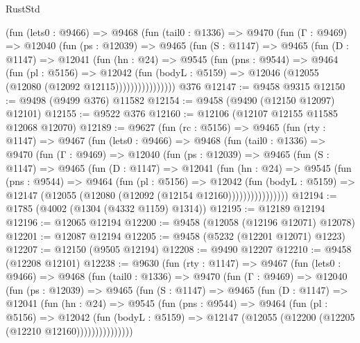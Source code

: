 \begin{lexlean}{RustStd}
\begin{coremodule}
          (fun (lets0 : @9466) =>
          @9468
            (fun (tail0 : @1336) =>
            @9470
              (fun (Γ : @9469) =>
              @12040
                (fun (ps : @12039) =>
                @9465
                  (fun (S : @1147) =>
                  @9465
                    (fun (D : @1147) =>
                    @12041
                      (fun (hn : @24) =>
                      @9545
                        (fun (pns : @9544) =>
                        @9464
                          (fun (pl : @5156) =>
                          @12042
                            (fun (bodyL : @5159) =>
                            @12046 (@12055 (@12080 (@12092 @12115))))))))))))))))
    @376
@12147 := @9458 @9315
@12150 := @9498 (@9499 @376) @11582
@12154 := @9458 (@9490 (@12150 @12097) @12101)
@12155 := @9522 @376
@12160 := @12106 (@12107 @12155 @11585 @12068 @12070)
@12189 := @9627
    (fun (rc : @5156) =>
    @9465
      (fun (rty : @1147) =>
      @9467
        (fun (lets0 : @9466) =>
        @9468
          (fun (tail0 : @1336) =>
          @9470
            (fun (Γ : @9469) =>
            @12040
              (fun (ps : @12039) =>
              @9465
                (fun (S : @1147) =>
                @9465
                  (fun (D : @1147) =>
                  @12041
                    (fun (hn : @24) =>
                    @9545
                      (fun (pns : @9544) =>
                      @9464
                        (fun (pl : @5156) =>
                        @12042
                          (fun (bodyL : @5159) =>
                          @12147 (@12055 (@12080 (@12092 (@12154 @12160))))))))))))))))
@12194 := @1785 (@4002 (@1304 (@4332 @1159) @1314))
@12195 := @12189 @12194
@12196 := @12065 @12194
@12200 := @9458 (@12058 (@12196 @12071) @12078)
@12201 := @12087 @12194
@12205 := @9458 (@5232 (@12201 @12071) @1223)
@12207 := @12150 (@9505 @12194)
@12208 := @9490 @12207
@12210 := @9458 (@12208 @12101)
@12238 := @9630
    (fun (rty : @1147) =>
    @9467
      (fun (lets0 : @9466) =>
      @9468
        (fun (tail0 : @1336) =>
        @9470
          (fun (Γ : @9469) =>
          @12040
            (fun (ps : @12039) =>
            @9465
              (fun (S : @1147) =>
              @9465
                (fun (D : @1147) =>
                @12041
                  (fun (hn : @24) =>
                  @9545
                    (fun (pns : @9544) =>
                    @9464
                      (fun (pl : @5156) =>
                      @12042
                        (fun (bodyL : @5159) =>
                        @12147 (@12055 (@12200 (@12205 (@12210 @12160)))))))))))))))

\end{coremodule}
\end{lexlean}
